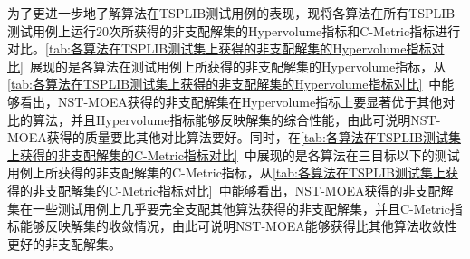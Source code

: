 \par
为了更进一步地了解算法在TSPLIB测试用例的表现，现将各算法在所有TSPLIB测试用例上运行20次所获得的非支配解集的Hypervolume指标和C-Metric指标进行对比。\autoref{tab:各算法在TSPLIB测试集上获得的非支配解集的Hypervolume指标对比}~展现的是各算法在测试用例上所获得的非支配解集的Hypervolume指标，从\autoref{tab:各算法在TSPLIB测试集上获得的非支配解集的Hypervolume指标对比}~中能够看出，NST-MOEA获得的非支配解集在Hypervolume指标上要显著优于其他对比的算法，并且Hypervolume指标能够反映解集的综合性能，由此可说明NST-MOEA获得的质量要比其他对比算法要好。同时，在\autoref{tab:各算法在TSPLIB测试集上获得的非支配解集的C-Metric指标对比}~中展现的是各算法在三目标以下的测试用例上所获得的非支配解集的C-Metric指标，从\autoref{tab:各算法在TSPLIB测试集上获得的非支配解集的C-Metric指标对比}~中能够看出，NST-MOEA获得的非支配解集在一些测试用例上几乎要完全支配其他算法获得的非支配解集，并且C-Metric指标能够反映解集的收敛情况，由此可说明NST-MOEA能够获得比其他算法收敛性更好的非支配解集。
